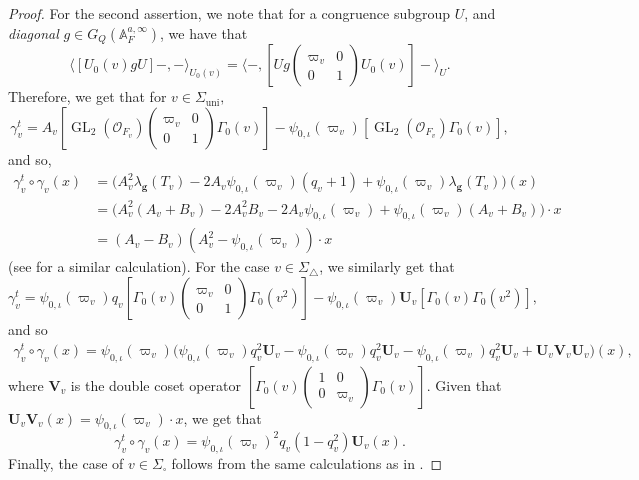 \documentclass[a4paper, notitlepage, 10pt]{amsart}
\theoremstyle{plain} %
\theoremstyle{definition} %
\theoremstyle{remark} %
\numberwithin{equation}{section}
\newcommand{\GL}{\operatorname{GL}} %
\newcommand{\uni}{\operatorname{uni}}
\begin{document}
\begin{proof}
          For the second assertion, we note that for a congruence subgroup $U$, and \emph{diagonal} $g\in G_Q(\mathbb{A}_{F}^{a,\infty})$, we have that 
         $$ \langle [ U_0(v)g U]-,-\rangle_{U_0(v)}=\langle-,[Ug\begin{pmatrix}
             \varpi_v & 0 \\ 0 & 1 
         \end{pmatrix}U_0(v)]-\rangle_U. $$
         Therefore, we get that for $v\in \Sigma_{\uni},$
         $$\gamma_v^t= A_v\left[ \GL_2(\mathcal{O}_{F_v}) \begin{pmatrix}
    \varpi_v & 0 \\ 0 & 1
\end{pmatrix} 
\Gamma_0(v)\right]- \psi_{0,\iota}(\varpi_v)  \left[
\GL_2(\mathcal{O}_{F_v})\Gamma_0(v)\right], $$
and so,
 \begin{align*}
     \gamma_v^t\circ \gamma_v(x)&= \big(A_v^2\lambda_{\mathbf{g}}(T_v)-2A_v\psi_{0,\iota}(\varpi_v)(q_v+1)+\psi_{0,\iota}(\varpi_v)\lambda_{\mathbf{g}}(T_v)\big) (x)
     \\ &= \big(A_v^2(A_v+B_v)-2A_v^2B_v-2A_v\psi_{0,\iota}(\varpi_v)+\psi_{0,\iota}(\varpi_v)(A_v+B_v)\big)\cdot x
    \\ &= (A_v-B_v)(A_v^2-\psi_{0,\iota}(\varpi_v))\cdot x
 \end{align*}
 (see \cite[proof of Lemma 6.4]{CH18} for a similar calculation). For the case $v\in \Sigma_{\triangle}$, we similarly get that
 $$ \gamma_v^t = \psi_{0,\iota}(\varpi_v)q_v\left[\Gamma_0(v) \begin{pmatrix}
    \varpi_v & 0 \\ 0 & 1
\end{pmatrix} \Gamma_0(v^2) \right]- \psi_{0,\iota}(\varpi_v) \mathbf{U}_v [\Gamma_0(v)\Gamma_0(v^2)], $$
 and so 
\begin{align*}
    \gamma_v^t\circ\gamma_v(x)= \psi_{0,\iota}(\varpi_v)\Big(\psi_{0,\iota}(\varpi_v)q_v^2\mathbf{U}_v- \psi_{0,\iota}(\varpi_v)q_v^2\mathbf{U}_v-\psi_{0,\iota}(\varpi_v)q_v^2\mathbf{U}_v+ \mathbf{U}_v \mathbf{V}_v\mathbf{U}_v\Big)(x),
\end{align*} 
where $\mathbf{V}_v$ is the double coset operator $[\Gamma_0(v) \begin{pmatrix}
    1 & 0 \\ 0 & \varpi_v
\end{pmatrix}\Gamma_0(v)]$. Given that $\mathbf{U}_v\mathbf{V}_v(x)=\psi_{0,\iota}(\varpi_v)\cdot x$, we get that 
$$\gamma^t_v\circ \gamma_v(x)= \psi_{0,\iota}(\varpi_v)^2q_v(1-q_v^2)\mathbf{U}_v(x).$$
Finally, the case of $v\in \Sigma_\square$ follows from the same calculations as in \cite[\S 3]{Tay06}.
 \end{proof}
\end{document}

